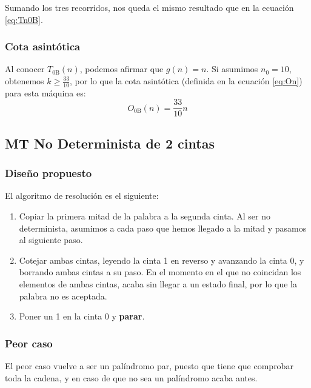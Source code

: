Sumando los tres recorridos, nos queda el mismo resultado que en la ecuación \ref{eq:Tn0B}.


\subsubsection*{Cota asintótica}
Al conocer $T_{\mathrm{0B}}(n)$, podemos afirmar que $g(n) = n$. Si asumimos $n_0 = 10$, obtenemos $k \geq \frac{33}{10}$, por lo que la cota asintótica (definida en la ecuación \ref{eq:On}) para esta máquina es:
\begin{equation}
    O_{\mathrm{0B}}(n) = \frac{33}{10} n
\end{equation}





\subsection{MT No Determinista de 2 cintas}

\subsubsection*{Diseño propuesto}
El algoritmo de resolución es el siguiente:

\begin{enumerate}
    \item Copiar la primera mitad de la palabra a la segunda cinta. Al ser no determinista, asumimos a cada paso que hemos llegado a la mitad y pasamos al siguiente paso.
    \item Cotejar ambas cintas, leyendo la cinta 1 en reverso y avanzando la cinta 0, y borrando ambas cintas a su paso. En el momento en el que no coincidan los elementos de ambas cintas, acaba sin llegar a un estado final, por lo que la palabra no es aceptada.
    \item Poner un 1 en la cinta 0 y \textbf{parar}.
\end{enumerate}



\subsubsection*{Peor caso}
El peor caso vuelve a ser un palíndromo par, puesto que tiene que comprobar toda la cadena, y en caso de que no sea un palíndromo acaba antes.



